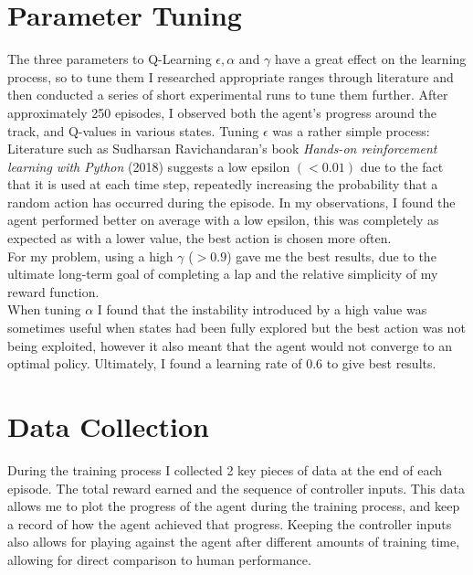 \section{Parameter Tuning}
The three parameters to Q-Learning $\epsilon, \alpha$ and $\gamma$ have a great effect on the learning process, so to tune them I researched appropriate ranges through literature and then conducted a series of short experimental runs to tune them further. After approximately 250 episodes, I observed both the agent's progress around the track, and Q-values in various states. Tuning $\epsilon$ was a rather simple process: Literature such as Sudharsan Ravichandaran's book \textit{Hands-on reinforcement learning with Python} (2018) \cite{ravichandiran2018hands} suggests a low epsilon  $(<0.01)$ due to the fact that it is used at each time step, repeatedly increasing the probability that a random action has occurred during the episode. In my observations, I found the agent performed better on average with a low epsilon, this was completely as expected as with a lower value, the best action is chosen more often.
\\For my problem, using a high $\gamma$ ($>0.9$) gave me the best results, due to the ultimate long-term goal of completing a lap and the relative simplicity of my reward function.
\\When tuning $\alpha$ I found that the instability introduced by a high value was sometimes useful when states had been fully explored but the best action was not being exploited, however it also meant that the agent would not converge to an optimal policy. Ultimately, I found a learning rate of $0.6$ to give best results.
\section{Data Collection}
During the training process I collected 2 key pieces of data at the end of each episode. The total reward earned and the sequence of controller inputs. This data allows me to plot the progress of the agent during the training process, and keep a record of how the agent achieved that progress. Keeping the controller inputs also allows for playing against the agent after different amounts of training time, allowing for direct comparison to human performance.